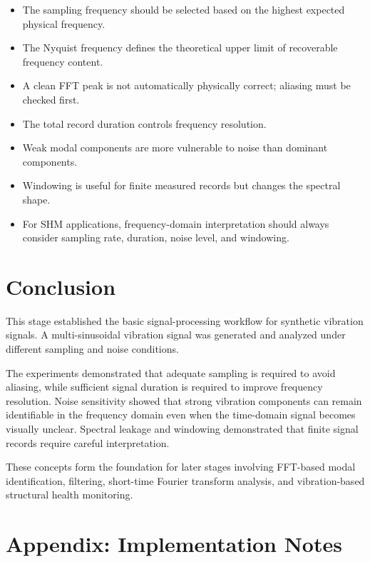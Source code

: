 \documentclass[11pt,a4paper]{article}
\begin{document}

\begin{itemize}
    \item The sampling frequency should be selected based on the highest expected physical frequency.
    \item The Nyquist frequency defines the theoretical upper limit of recoverable frequency content.
    \item A clean FFT peak is not automatically physically correct; aliasing must be checked first.
    \item The total record duration controls frequency resolution.
    \item Weak modal components are more vulnerable to noise than dominant components.
    \item Windowing is useful for finite measured records but changes the spectral shape.
    \item For SHM applications, frequency-domain interpretation should always consider sampling rate, duration, noise level, and windowing.
\end{itemize}

\section{Conclusion}

This stage established the basic signal-processing workflow for synthetic vibration signals. A multi-sinusoidal vibration signal was generated and analyzed under different sampling and noise conditions.

The experiments demonstrated that adequate sampling is required to avoid aliasing, while sufficient signal duration is required to improve frequency resolution. Noise sensitivity showed that strong vibration components can remain identifiable in the frequency domain even when the time-domain signal becomes visually unclear. Spectral leakage and windowing demonstrated that finite signal records require careful interpretation.

These concepts form the foundation for later stages involving FFT-based modal identification, filtering, short-time Fourier transform analysis, and vibration-based structural health monitoring.

\section*{Appendix: Implementation Notes}
\end{document}
